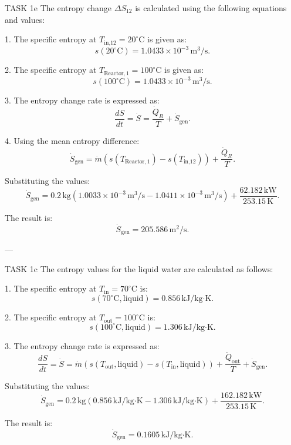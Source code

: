 TASK 1e  
The entropy change \( \Delta S_{12} \) is calculated using the following equations and values:

1. The specific entropy at \( T_{\text{in,12}} = 20^\circ\text{C} \) is given as:  
\[
s(20^\circ\text{C}) = 1.0433 \times 10^{-3} \, \text{m}^3/\text{s}.
\]

2. The specific entropy at \( T_{\text{Reactor},1} = 100^\circ\text{C} \) is given as:  
\[
s(100^\circ\text{C}) = 1.0433 \times 10^{-3} \, \text{m}^3/\text{s}.
\]

3. The entropy change rate is expressed as:  
\[
\frac{dS}{dt} = \dot{S} = \frac{\dot{Q}_R}{T} + \dot{S}_{\text{gen}}.
\]

4. Using the mean entropy difference:  
\[
\dot{S}_{\text{gen}} = \dot{m} \left( s(T_{\text{Reactor},1}) - s(T_{\text{in,12}}) \right) + \frac{\dot{Q}_R}{T}.
\]

Substituting the values:  
\[
\dot{S}_{\text{gen}} = 0.2 \, \text{kg} \left( 1.0033 \times 10^{-3} \, \text{m}^3/\text{s} - 1.0411 \times 10^{-3} \, \text{m}^3/\text{s} \right) + \frac{62.182 \, \text{kW}}{253.15 \, \text{K}}.
\]

The result is:  
\[
\dot{S}_{\text{gen}} = 205.586 \, \text{m}^2/\text{s}.
\]

---

TASK 1c  
The entropy values for the liquid water are calculated as follows:

1. The specific entropy at \( T_{\text{in}} = 70^\circ\text{C} \) is:  
\[
s(70^\circ\text{C}, \text{liquid}) = 0.856 \, \text{kJ}/\text{kg·K}.
\]

2. The specific entropy at \( T_{\text{out}} = 100^\circ\text{C} \) is:  
\[
s(100^\circ\text{C}, \text{liquid}) = 1.306 \, \text{kJ}/\text{kg·K}.
\]

3. The entropy change rate is expressed as:  
\[
\frac{dS}{dt} = \dot{S} = \dot{m} \left( s(T_{\text{out}}, \text{liquid}) - s(T_{\text{in}}, \text{liquid}) \right) + \frac{\dot{Q}_{\text{out}}}{T} + \dot{S}_{\text{gen}}.
\]

Substituting the values:  
\[
\dot{S}_{\text{gen}} = 0.2 \, \text{kg} \left( 0.856 \, \text{kJ}/\text{kg·K} - 1.306 \, \text{kJ}/\text{kg·K} \right) + \frac{162.182 \, \text{kW}}{253.15 \, \text{K}}.
\]

The result is:  
\[
\dot{S}_{\text{gen}} = 0.1605 \, \text{kJ}/\text{kg·K}.
\]
